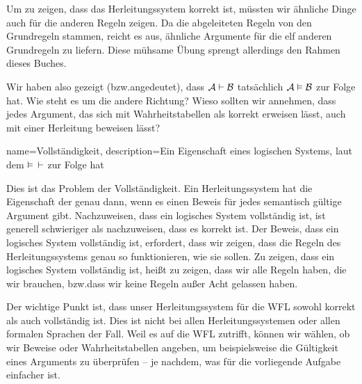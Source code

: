 Um zu zeigen, dass das Herleitungssystem korrekt ist, müssten wir ähnliche Dinge auch für die anderen Regeln zeigen. Da die abgeleiteten Regeln von den Grundregeln stammen, reicht es aus, ähnliche Argumente für die elf anderen Grundregeln zu liefern. Diese mühsame Übung sprengt allerdings den Rahmen dieses Buches.

Wir haben also gezeigt (bzw.\@ angedeutet), dass $\mathcal{A} \vdash \mathcal{B}$ tatsächlich  $\mathcal{A} \vDash \mathcal{B}$ zur Folge hat. Wie steht es um die andere Richtung? Wieso sollten wir annehmen, dass jedes Argument, das sich mit Wahrheitstabellen als korrekt erweisen lässt, auch mit einer Herleitung beweisen lässt? 

{
name=Vollständigkeit,
description={Ein Eigenschaft eines logischen Systems, laut dem $\vDash$ $\vdash $ zur Folge hat}
}

Dies ist das Problem der Vollständigkeit. Ein Herleitungssystem hat die Eigenschaft der   genau dann, wenn es einen Beweis für jedes semantisch gültige Argument gibt. Nachzuweisen, dass ein logisches System vollständig ist, ist generell schwieriger als nachzuweisen, dass es korrekt ist. Der Beweis, dass ein logisches System vollständig ist, erfordert, dass wir zeigen, dass die Regeln des Herleitungssystems genau so funktionieren, wie sie sollen. Zu zeigen, dass ein logisches System vollständig ist, hei{\ss}t zu zeigen, dass wir alle Regeln haben, die wir brauchen, bzw.\@ dass wir keine Regeln au{\ss}er Acht gelassen haben.

Der wichtige Punkt ist, dass unser Herleitungssystem für die WFL sowohl korrekt als auch vollständig ist. Dies ist nicht bei allen Herleitungssystemen oder allen formalen Sprachen der Fall. Weil es auf die WFL zutrifft, können wir wählen, ob wir Beweise oder Wahrheitstabellen angeben, um beispielsweise die Gültigkeit eines Arguments zu überprüfen -- je nachdem, was für die vorliegende Aufgabe einfacher ist.


